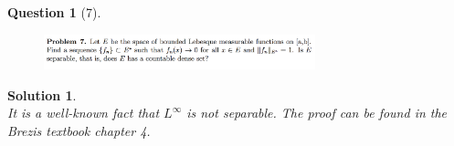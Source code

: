 \documentclass{article} %
\theoremstyle{quest}
\newtheorem*{question}{Question}
\newtheorem*{solution}{Solution}
\begin{document}
\newpage

\begin{question}[7]
\hfill
\begin{figure}[h!]
  \centering
    \includegraphics[width=0.7\textwidth]{funcA-h-e1-p7.png}
\end{figure}
\end{question}
\begin{solution} \hfill \\

It is a well-known fact that $L^{\infty}$ is not separable. The proof can be
found in the Brezis textbook chapter 4.  
\end{solution} 
\end{document}
